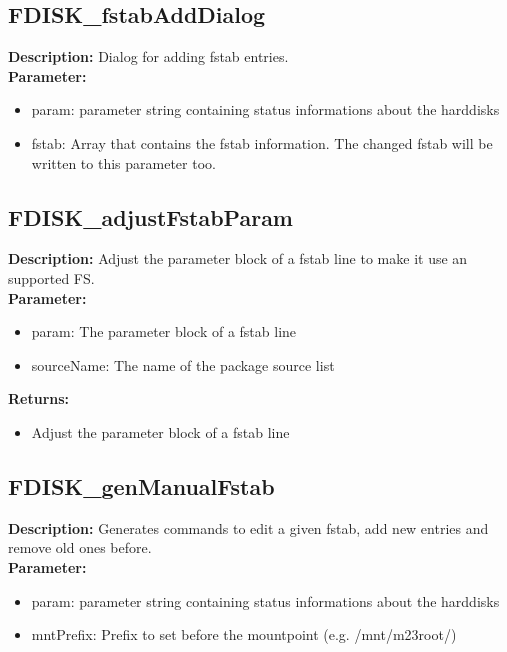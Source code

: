 \subsection{FDISK\_fstabAddDialog}
\textbf{Description:} Dialog for adding fstab entries.\\
\textbf{Parameter:}
\begin{itemize}
\item param: parameter string containing status informations about the harddisks
\item fstab: Array that contains the fstab information. The changed fstab will be written to this parameter too.
\end{itemize}

\subsection{FDISK\_adjustFstabParam}
\textbf{Description:} Adjust the parameter block of a fstab line to make it use an supported FS.\\
\textbf{Parameter:}
\begin{itemize}
\item param: The parameter block of a fstab line
\item sourceName: The name of the package source list
\end{itemize}
\textbf{Returns:}
\begin{itemize}
\item Adjust the parameter block of a fstab line
\end{itemize}

\subsection{FDISK\_genManualFstab}
\textbf{Description:} Generates commands to edit a given fstab, add new entries and remove old ones before.\\
\textbf{Parameter:}
\begin{itemize}
\item param: parameter string containing status informations about the harddisks
\item mntPrefix: Prefix to set before the mountpoint (e.g. /mnt/m23root/)
\end{itemize}

